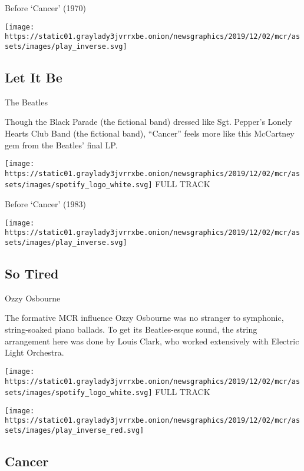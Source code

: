 Before `Cancer' (1970)

\texttt{[image: https://static01.graylady3jvrrxbe.onion/newsgraphics/2019/12/02/mcr/assets/images/play\_inverse.svg]}

\hypertarget{let-it-be}{%
\subsection{Let It Be}\label{let-it-be}}

The Beatles

Though the Black Parade (the fictional band) dressed like Sgt. Pepper's
Lonely Hearts Club Band (the fictional band), ``Cancer'' feels more like
this McCartney gem from the Beatles' final LP.

\href{https://open.spotify.com/track/7iN1s7xHE4ifF5povM6A48?si=wKV29DpBQtG_wnIBBFarFw}{}

\texttt{[image: https://static01.graylady3jvrrxbe.onion/newsgraphics/2019/12/02/mcr/assets/images/spotify\_logo\_white.svg]}
FULL TRACK

Before `Cancer' (1983)

\texttt{[image: https://static01.graylady3jvrrxbe.onion/newsgraphics/2019/12/02/mcr/assets/images/play\_inverse.svg]}

\hypertarget{so-tired}{%
\subsection{So Tired}\label{so-tired}}

Ozzy Osbourne

The formative MCR influence Ozzy Osbourne was no stranger to symphonic,
string-soaked piano ballads. To get its Beatles-esque sound, the string
arrangement here was done by Louis Clark, who worked extensively with
Electric Light Orchestra.

\href{https://open.spotify.com/track/3kZUWSoGjfRa3AZ1Kqzjen?si=OoY43xnnTUWftDvTWNZaVQ}{}

\texttt{[image: https://static01.graylady3jvrrxbe.onion/newsgraphics/2019/12/02/mcr/assets/images/spotify\_logo\_white.svg]}
FULL TRACK

\texttt{[image: https://static01.graylady3jvrrxbe.onion/newsgraphics/2019/12/02/mcr/assets/images/play\_inverse\_red.svg]}

\hypertarget{cancer-1}{%
\subsection{Cancer}\label{cancer-1}}

